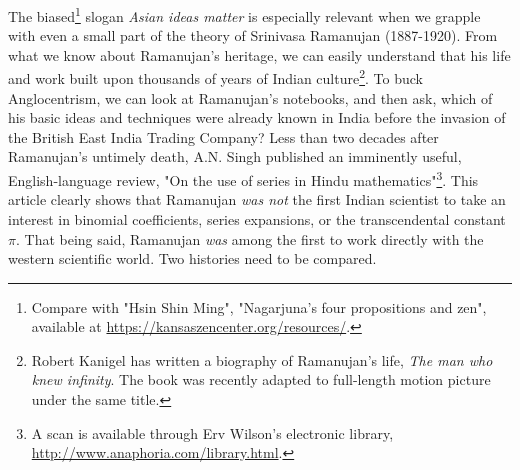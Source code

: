 \documentclass[nofootinbib,preprint]{revtex4-1}
\begin{document}
The biased\footnote{Compare with "Hsin Shin Ming", "Nagarjuna's four propositions
and zen", available at
\href{https://kansaszencenter.org/resources/}{https://kansaszencenter.org/resources/}.}
 slogan \textit{Asian ideas matter} is especially relevant when we grapple with even a small 
part of the theory of Srinivasa Ramanujan (1887-1920). From what we know about Ramanujan's heritage, 
we can easily understand that his life and work built upon thousands of years of Indian 
culture\footnote{Robert Kanigel has written a biography of Ramanujan's life, \textit{The man who knew infinity}.
The book was recently adapted to full-length motion picture under the same title.}. 
To buck Anglocentrism, we can look at Ramanujan's notebooks, and then ask, which of his basic 
ideas and techniques were already known in India before the invasion of the British East India Trading Company? Less than two decades after Ramanujan's untimely death,  A.N. Singh published an 
imminently useful, English-language review, "On the use of series in Hindu mathematics"\footnote{A 
scan is available through Erv Wilson's electronic library, 
\href{http://www.anaphoria.com/library.html}{http://www.anaphoria.com/library.html}.}\cite{SINGH1936}. 
This article clearly shows that Ramanujan \textit{was not} the first Indian scientist to take
an interest in binomial coefficients, series expansions, or the transcendental constant $\pi$. 
That being said, Ramanujan \textit{was} among the first to work directly with 
the western scientific world. Two histories need to be compared.
\end{document}
